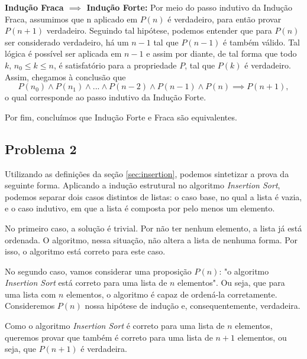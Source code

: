 \documentclass[a4paper, 10pt]{article}
\begin{document}
\textbf{Indução Fraca $\implies$ Indução Forte:}
	Por meio do passo indutivo da Indução Fraca, assumimos que n aplicado em $P(n)$ é verdadeiro, para então provar $P(n+1)$ verdadeiro.
	Seguindo tal hipótese, podemos entender que para $P(n)$ ser considerado verdadeiro, há um $n-1$ tal que $P(n-1)$ é também válido. Tal lógica é possível ser aplicada em $n-1$ e assim por diante, de tal forma que todo $k$, $n_0 \leq k \leq n$, é satisfatório para a propriedade $P$, tal que $P(k)$ é verdadeiro.
	Assim, chegamos à conclusão que 
\begin{equation*}
  P(n_0) \wedge P(n_1) \wedge ... \wedge P(n-2) \wedge P(n-1) \wedge P(n) \implies P(n+1),
\end{equation*}    
    o qual corresponde ao passo indutivo da Indução Forte.

Por fim, concluímos que Indução Forte e Fraca são equivalentes.

\subsection{Problema 2}

Utilizando as definições da seção \ref{sec:insertion}, podemos sintetizar a prova da seguinte forma.
Aplicando a indução estrutural no algoritmo \textit{Insertion Sort}, podemos separar dois casos distintos de listas: o caso base, no qual a lista é vazia, e o caso indutivo, em que a lista é composta por pelo menos um elemento.

No primeiro caso, a solução é trivial. Por não ter nenhum elemento, a lista já está ordenada. O algoritmo, nessa situação, não altera a lista de nenhuma forma. Por isso, o algoritmo está correto para este caso.

No segundo caso, vamos considerar uma proposição $P(n)$: "o algoritmo \textit{Insertion Sort} está correto para uma lista de $n$ elementos". Ou seja, que para uma lista com $n$ elementos, o algoritmo é capaz de ordená-la corretamente. Consideremos $P(n)$ nossa hipótese de indução e, consequentemente, verdadeira.

Como o algoritmo \textit{Insertion Sort} é correto para uma lista de $n$ elementos, queremos provar que também é correto para uma lista de $n+1$ elementos, ou seja, que $P(n+1)$ é verdadeira.
\end{document}
